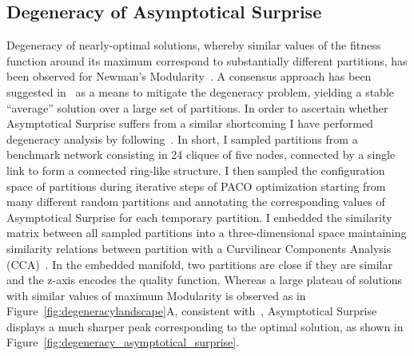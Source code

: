 

\subsection{Degeneracy of Asymptotical Surprise}\label{sec:degeneracy_asymptotical_surprise}
Degeneracy of nearly-optimal solutions, whereby similar values of the fitness function around its maximum correspond to substantially different partitions, has been observed for Newman's Modularity~\cite{good2009}.
A consensus approach has been suggested in~\cite{lancichinetti2012} as a means to mitigate the degeneracy problem, yielding a stable ``average'' solution over a large set of partitions.
In order to ascertain whether Asymptotical Surprise suffers from a similar shortcoming I have performed degeneracy analysis by following~\cite{good2009}.
In short, I sampled partitions from a benchmark network consisting in 24 cliques of five nodes, connected by a single link to form a connected ring-like structure.
I then sampled the configuration space of partitions during iterative steps of PACO optimization starting from many different random partitions and annotating the corresponding values of Asymptotical Surprise for each temporary partition.
I embedded the similarity matrix between all sampled partitions into a three-dimensional space maintaining similarity relations between partition with a Curvilinear Components Analysis (CCA)~\cite{good2009}.
In the embedded manifold, two partitions are close if they are similar and the z-axis encodes the quality function.
Whereas a large plateau of solutions with similar values of maximum Modularity is observed as in Figure~\ref{fig:degeneracylandscape}A, consistent with~\cite{good2009}, Asymptotical Surprise displays a much sharper peak corresponding to the optimal solution, as shown in Figure~\ref{fig:degeneracy_asymptotical_surprise}.

